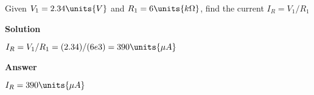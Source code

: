 \question Given \mbox{$V_{1} = \mbox{$2.34 \units{ V}$}$} and \mbox{$R_{1} = \mbox{$6 \units{k \Omega}$}$}, find the current  $I_R = V_1/R_1$


\begin{solutions}
\textbf{Solution}

\mbox{$I_{R}=V_{1}/R_{1}  = (2.34)/(6e3) = \mbox{$390 \units{\mu A}$}$}\\
\end{solutions}


\begin{answers}
\textbf{Answer}

\mbox{$I_{R} = \mbox{$390 \units{\mu A}$}$}
\end{answers}

